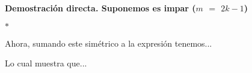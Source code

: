 \documentclass[12pt]{article}
\renewcommand{\qedsymbol}{$\blacksquare$}
\newenvironment{MyColorPar}[1]{%
    \leavevmode\color{#1}\ignorespaces%
}{%
}%
\begin{document}
\begin{MyColorPar}{Tarawera}\bfseries
{\textcolor{Cinnabar}{\bfseries{Demostración directa}}}. Suponemos {} es impar {\textcolor{verde_manzana}{\bfseries{($m$ $=$ $2k-1$)}}} \vspace{0.5cm}

 {\Large$*$} \vspace{0.5cm}

Ahora, sumando este simétrico a la expresión {\black{{\Large$*$}}} tenemos...  \vspace{0.5cm}

{} \vspace{0.5cm} 

Lo cual muestra que...  
\vspace{0.5cm}

{}  \vspace{0.5cm}

\hspace{1cm} {\black{ \qedsymbol }} \vspace{1cm}
\end{MyColorPar}
\end{document}
